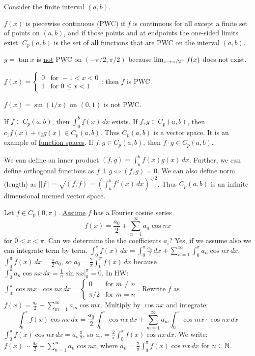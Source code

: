 \documentclass[]{article}
\begin{document}
Consider the finite interval $(a,b)$.
\begin{definition}
	$f(x)$ is piecewise continuous (PWC) if $f$ is continuous for all except a finite set of points on $(a,b)$, and if those points and at endpoints the one-sided limits exist. $C_p(a,b)$ is the set of all functions that are PWC on the interval $(a,b)$.
\end{definition}
\begin{example}
	$y=\tan x$ is \underline{not} PWC on $(-\pi/2,\pi/2)$ because $\lim_{x\rightarrow\pi/2^-}f(x)$ does  not exist.
\end{example}
\begin{example}
	$f(x)=\begin{cases}0 & \text{for }-1<x<0 \\ 1 & \text{for }0\leq x<1\end{cases}$: then $f$ is PWC.
\end{example}
\begin{example}
	$f(x)=\sin(1/x)$ on $(0,1)$ is not PWC.
\end{example}
\begin{note}
	If $f\in C_p(a,b)$, then $\int_a^bf(x) \, dx$ exists.
	If $f,g\in C_p(a,b)$, then $c_1f(x) + c_2 g(x) \in C_p(a,b)$.
	Thus $C_p(a,b)$ is a vector space. It is an example of \underline{function spaces}.
	If $f,g\in C_p(a,b)$, then $f\cdot g\in C_p(a,b)$.
\end{note}
We can define an inner product $(f,g)=\int_a^b f(x) g(x) \, dx$. 
Further, we can define orthogonal functions as $f\perp g \iff (f,g)=0$.
We can also define norm (length) as $||f||=\sqrt{(f,f)}=\left(\int_a^b f^2(x) \, dx\right)^{1/2}$.
Thus $C_p(a,b)$ is an infinite dimensional normed vector space.

Let $f\in C_p(0,\pi)$. \underline{Assume} $f$ has a Fourier cosine series
\begin{equation}
f(x)=\frac{a_0}{2} + \sum_{n=1}^{\infty}a_n \cos{nx}
\end{equation}
for $0<x<\pi$. 
Can we determine the the coefficients $a_i$? Yes, if we assume also we can integrate term by term.
$\int_0^\pi f(x) \, dx = \int_0^\pi \frac{a_0}{2} \, dx + \sum_{n=1}^{\infty} \int_0^\pi a_n \cos{nx} \, dx$. $\int_0^\pi f(x) \, dx = \frac{\pi}{2}a_0$, so $a_0 = \frac{2}{\pi} \int_0^\pi f(x) \, dx$ because $\int_0^\pi a_n \cos{nx} \, dx = \frac{1}{n} \sin{nx}\big\rvert_0^\pi=0$.
In HW: $\int_0^\pi\cos{mx}\cdot\cos{nx} \, dx = \begin{cases}0 & \text{for } m\neq n \\ \pi/2 & \text{for }m=n\end{cases}$.
Rewrite $f$ as $f(x)=\frac{a_0}{2}+\sum_{m=1}^\infty a_m \cos{mx}$. Multiply by $\cos{nx}$ and integrate: 
$$\int_0^\pi f(x) \cos{nx} \, dx = \frac{a_0}{2}\int_0^\pi \cos{nx} \, dx + \sum_{m=1}^\infty a_m \int_0^\pi \cos{mx} \cdot \cos{nx} \, dx$$
$\int_0^\pi f(x) \cos{nx} \, dx = a_n \frac{\pi}{2}$, so $a_n = \frac{2}{\pi} \int_0^\pi f(x) \cos{nx} \, dx$.
We write: $f(x) \sim \frac{a_0}{2} + \sum_{n=1}^\infty a_n \cos{nx}$, where $a_n=\frac{2}{\pi} \int_0^\pi f(x)\cos{nx} \, dx$ for $n\in\mathbb{N}$.
\end{document}
